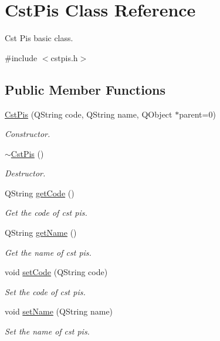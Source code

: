 \hypertarget{class_cst_pis}{\section{\-Cst\-Pis \-Class \-Reference}
\label{class_cst_pis}
}


\-Cst \-Pis basic class.  




{\ttfamily \#include $<$cstpis.\-h$>$}

\subsection*{\-Public \-Member \-Functions}
\begin{DoxyCompactItemize}
\item 
\hyperlink{class_cst_pis_a8d282f4baa229004a9236a5cad0dbf52}{\-Cst\-Pis} (\-Q\-String code, \-Q\-String name, \-Q\-Object $\ast$parent=0)
\begin{DoxyCompactList}\small\item\em \-Constructor. \end{DoxyCompactList}\item 
\hyperlink{class_cst_pis_a6277614cd27affa6efda27aadae24c51}{$\sim$\-Cst\-Pis} ()
\begin{DoxyCompactList}\small\item\em \-Destructor. \end{DoxyCompactList}\item 
\-Q\-String \hyperlink{class_cst_pis_a200b043d6402ade00c38290c78b19e6d}{get\-Code} ()
\begin{DoxyCompactList}\small\item\em \-Get the code of cst pis. \end{DoxyCompactList}\item 
\-Q\-String \hyperlink{class_cst_pis_abd04404c9742c48ba2e075a55f14e962}{get\-Name} ()
\begin{DoxyCompactList}\small\item\em \-Get the name of cst pis. \end{DoxyCompactList}\item 
void \hyperlink{class_cst_pis_af0e9d67911b66afb49841f1861e5b352}{set\-Code} (\-Q\-String code)
\begin{DoxyCompactList}\small\item\em \-Set the code of cst pis. \end{DoxyCompactList}\item 
void \hyperlink{class_cst_pis_acda2a5c25cf0e6f346cdd3475f98bfe9}{set\-Name} (\-Q\-String name)
\begin{DoxyCompactList}\small\item\em \-Set the name of cst pis. \end{DoxyCompactList}\end{DoxyCompactItemize}


